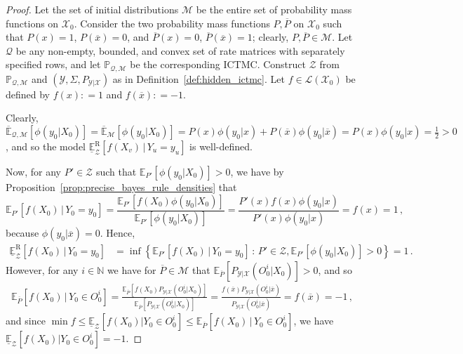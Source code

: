 \documentclass[twoside,11pt]{article}
\newcommand{\nats}{\mathbb{N}}
\newcommand{\states}{\mathcal{X}}
\newcommand{\observs}{\mathcal{Y}}
\newcommand{\uexp}{\overline{\mathbb{E}}_{\rateset,\mathcal{M}}}
\newcommand{\gambles}{\mathcal{L}}
\newcommand{\rateset}{\mathcal{Q}}
\newcommand{\coloneqq}{:\!=}
\begin{document}
\begin{proof}
Let the set of initial distributions $\mathcal{M}$ be the entire set of probability mass functions on $\states_0$. Consider the two probability mass functions $P,\overline{P}$ on $\states_0$ such that $P(x)=1$, $P(\overline{x})=0$, and $\overline{P}(x)=0$, $\overline{P}(\overline{x})=1$; clearly, $P,\overline{P}\in\mathcal{M}$. Let $\rateset$ be any non-empty, bounded, and convex set of rate matrices with separately specified rows, and let $\mathbb{P}_{\rateset,\mathcal{M}}$ be the corresponding ICTMC. Construct $\mathcal{Z}$ from $\mathbb{P}_{\rateset,\mathcal{M}}$ and $(\observs,\Sigma,P_{\observs\vert\states})$ as in Definition~\ref{def:hidden_ictmc}. Let $f\in\gambles(\states_0)$ be defined by $f(x)\coloneqq 1$ and $f(\overline{x})\coloneqq -1$. 

Clearly, $\uexp[\phi(y_0\vert X_0)]=\overline{\mathbb{E}}_\mathcal{M}[\phi(y_0\vert X_0)] = P(x)\phi(y_0\vert x) + P(\overline{x})\phi(y_0\vert \overline{x})=P(x)\phi(y_0\vert x) = \frac{1}{2}>0$, and so the model $\underline{\mathbb{E}}_\mathcal{Z}^\mathrm{R}[f(X_v)\,\vert\, Y_u=y_u]$ is well-defined.

Now, for any $P'\in\mathcal{Z}$ such that $\mathbb{E}_{P'}[\phi(y_0\vert X_0)]>0$, we have by Proposition~\ref{prop:precise_bayes_rule_densities} that
\begin{equation*}
\mathbb{E}_{P'}[f(X_0)\,\vert\,Y_0=y_0] = \frac{\mathbb{E}_{P'}[f(X_0)\phi(y_0\vert X_0)]}{\mathbb{E}_{P'}[\phi(y_0\vert X_0)]} = \frac{P'(x)f(x)\phi(y_0\vert x)}{P'(x)\phi(y_0\vert x)} = f(x) = 1\,,
\end{equation*}
because $\phi(y_0\vert \overline{x})=0$. Hence,
\begin{align*}
\underline{\mathbb{E}}_\mathcal{Z}^\mathrm{R}[f(X_0)\,\vert\, Y_0=y_0] &= \inf\left\{ \mathbb{E}_{P'}[f(X_0)\,\vert\,Y_0=y_0]\,:\,P'\in\mathcal{Z}, \mathbb{E}_{P'}[\phi(y_0\vert X_0)]>0  \right\} = 1\,.
\end{align*}
However, for any $i\in\nats$ we have for $\overline{P}\in\mathcal{M}$ that %
$\mathbb{E}_{\overline{P}}[P_{\observs\vert\states}(O_0^i\vert X_0)]>0$, and so
\begin{align*}
\mathbb{E}_{\overline{P}}[f(X_0)\,\vert\,Y_0\in O_0^i] = \frac{\mathbb{E}_{\overline{P}}[f(X_0)P_{\observs\vert\states}(O_0^i\vert X_0)]}{\mathbb{E}_{\overline{P}}[P_{\observs\vert\states}(O_0^i\vert X_0)]} = \frac{f(\overline{x})P_{\observs\vert\states}(O_0^i\vert \overline{x})}{P_{\observs\vert\states}(O_0^i\vert \overline{x})} = f(\overline{x}) = -1\,,
\end{align*}
and since $\min f \leq \underline{\mathbb{E}}_\mathcal{Z}[f(X_0)\vert Y_0\in O_0^i] \leq \mathbb{E}_{\overline{P}}[f(X_0)\,\vert\,Y_0\in O_0^i]$, we have $\underline{\mathbb{E}}_\mathcal{Z}[f(X_0)\vert Y_0\in O_0^i]=-1$.


\end{proof}
\end{document}
